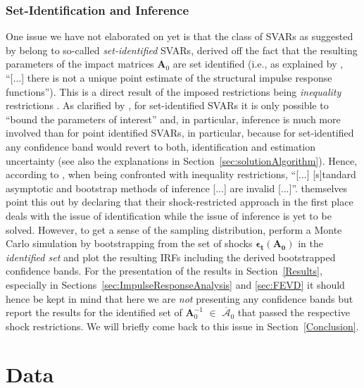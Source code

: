 \documentclass[a4paper,11pt,listof=nochaptergap,oneside,pointednumbers,bibtotoc,bigheadings,liststotoc,hidelinks]{scrbook}
\theoremstyle{mysatz}
\theoremstyle{mydefinition}
\theoremstyle{mytheorem}
\theoremstyle{mybemerkung}
\newcommand{\vect}[1]{\boldsymbol{\mathbf{#1}}}
\begin{document}
\subsection{Set-Identification and Inference}
\label{sec:setIdentificationAndInference}
One issue we have not elaborated on yet is that the class of SVARs as suggested by \citet{ludvigsonetal:19} belong to so-called \textit{set-identified} SVARs, derived off the fact that the resulting parameters of the impact matrices $\vect{A}_0$ are set identified (i.e., as explained by \citet[p. 437]{lutkepohlkilian:17}, ``[...] there is not a unique point estimate of the structural impulse response functions''). This is a direct result of the imposed restrictions being \textit{inequality} restrictions \citep{lutkepohlkilian:17}. As clarified by \citet[p. 422]{lutkepohlkilian:17}, for set-identified SVARs it is only possible to ``bound the parameters of interest'' and, in particular, inference is much more involved than for point identified SVARs, in particular, because for set-identified any confidence band would revert to both, identification and estimation uncertainty (see also the explanations in Section~\ref{sec:solutionAlgorithm}). Hence, according to \citet[p. 437]{lutkepohlkilian:17}, when being confronted with inequality restrictions, ``[...] [s]tandard asymptotic and bootstrap methods of inference [...] are invalid [...]''. \citet{ludvigsonetal:19} themselves point this out by declaring that their shock-restricted approach in the first place deals with the issue of identification while the issue of inference is yet to be solved. However, to get a sense of the sampling distribution, \citet{ludvigsonetal:19} perform a Monte Carlo simulation by bootstrapping from the set of shocks $\vect{\epsilon_t}({\vect{A_0}})$ in the \textit{identified set} and plot the resulting IRFs including the derived bootstrapped confidence bands. For the presentation of the results in Section~\ref{Results}, especially in Sections~\ref{sec:ImpulseResponseAnalysis} and \ref{sec:FEVD} it should hence be kept in mind that here we are \textit{not} presenting any confidence bands but report the results for the identified set of $\vect{A}_0^{-1}$ $\in$ $\overline{\vect{\mathcal{A}}}_0$ that passed the respective shock restrictions. We will briefly come back to this issue in Section~\ref{Conclusion}.

\chapter{Data}
\label{sec:Data}
\end{document}
